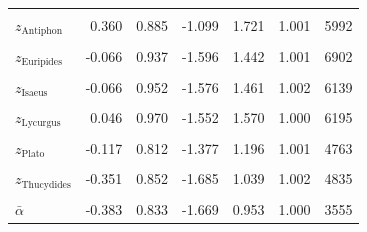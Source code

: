 \begin{longtable}{lrrrrrr}
\cellcolor{gray!10}{$z_{\text{Andocides}}$} & \cellcolor{gray!10}{-0.007} & \cellcolor{gray!10}{0.907} & \cellcolor{gray!10}{-1.472} & \cellcolor{gray!10}{1.386} & \cellcolor{gray!10}{1.000} & \cellcolor{gray!10}{6114}\\
$z_{\text{Antiphon}}$ & 0.360 & 0.885 & -1.099 & 1.721 & 1.001 & 5992\\
\cellcolor{gray!10}{$z_{\text{Demosthenes}}$} & \cellcolor{gray!10}{-0.187} & \cellcolor{gray!10}{0.841} & \cellcolor{gray!10}{-1.531} & \cellcolor{gray!10}{1.164} & \cellcolor{gray!10}{1.002} & \cellcolor{gray!10}{5626}\\
$z_{\text{Euripides}}$ & -0.066 & 0.937 & -1.596 & 1.442 & 1.001 & 6902\\
\cellcolor{gray!10}{$z_{\text{Herodotus}}$} & \cellcolor{gray!10}{-0.448} & \cellcolor{gray!10}{1.034} & \cellcolor{gray!10}{-2.037} & \cellcolor{gray!10}{1.232} & \cellcolor{gray!10}{1.004} & \cellcolor{gray!10}{3590}\\
$z_{\text{Isaeus}}$ & -0.066 & 0.952 & -1.576 & 1.461 & 1.002 & 6139\\
\cellcolor{gray!10}{$z_{\text{Isocrates}}$} & \cellcolor{gray!10}{0.494} & \cellcolor{gray!10}{0.880} & \cellcolor{gray!10}{-0.927} & \cellcolor{gray!10}{1.850} & \cellcolor{gray!10}{1.004} & \cellcolor{gray!10}{5836}\\
$z_{\text{Lycurgus}}$ & 0.046 & 0.970 & -1.552 & 1.570 & 1.000 & 6195\\
\cellcolor{gray!10}{$z_{\text{Lysias}}$} & \cellcolor{gray!10}{0.645} & \cellcolor{gray!10}{0.885} & \cellcolor{gray!10}{-0.840} & \cellcolor{gray!10}{2.008} & \cellcolor{gray!10}{1.002} & \cellcolor{gray!10}{4386}\\
$z_{\text{Plato}}$ & -0.117 & 0.812 & -1.377 & 1.196 & 1.001 & 4763\\
\cellcolor{gray!10}{$z_{\text{Sophocles}}$} & \cellcolor{gray!10}{0.040} & \cellcolor{gray!10}{0.945} & \cellcolor{gray!10}{-1.474} & \cellcolor{gray!10}{1.544} & \cellcolor{gray!10}{1.001} & \cellcolor{gray!10}{5247}\\
$z_{\text{Thucydides}}$ & -0.351 & 0.852 & -1.685 & 1.039 & 1.002 & 4835\\
\cellcolor{gray!10}{$z_{\text{Xenophon}}$} & \cellcolor{gray!10}{-0.690} & \cellcolor{gray!10}{0.793} & \cellcolor{gray!10}{-1.930} & \cellcolor{gray!10}{0.546} & \cellcolor{gray!10}{1.002} & \cellcolor{gray!10}{4678}\\
$\bar{\alpha}$ & -0.383 & 0.833 & -1.669 & 0.953 & 1.000 & 3555\\

\end{longtable}
